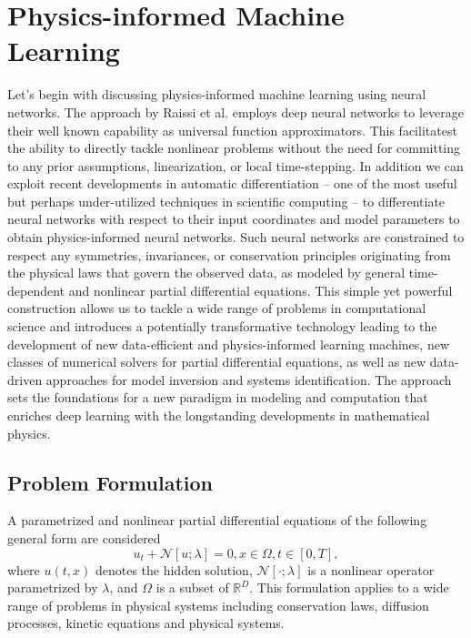\documentclass[book.tex]{subfiles}
\begin{document}
\section{Physics-informed Machine Learning}
Let's begin with discussing physics-informed machine learning using neural networks. The approach by Raissi et al.\cite{raissi2019physics} employs deep neural networks to leverage their well known capability as universal function approximators. This facilitatest the ability to directly tackle nonlinear problems without the need for committing to any prior assumptions, linearization, or local time-stepping. In addition we can exploit recent developments in automatic differentiation – one of the most useful but perhaps under-utilized techniques in scientific computing – to differentiate neural networks with respect to their input coordinates and model parameters to obtain physics-informed neural networks. Such neural networks are constrained to respect any symmetries, invariances, or conservation principles originating from the physical laws that govern the observed data, as modeled by general time-dependent and nonlinear partial differential equations. This simple yet powerful construction allows us to tackle a wide range of problems in computational science and introduces a potentially transformative technology leading to the development of new data-efficient and physics-informed learning machines, new classes of numerical solvers for partial differential equations, as well as new data-driven approaches for model inversion and systems identification. The approach sets the foundations for a new paradigm in modeling and computation that enriches deep learning with the longstanding developments in mathematical physics.

\subsection{Problem Formulation}
A parametrized and nonlinear partial differential equations of the following general form are considered 
\begin{equation}
    u_t + \mathcal{N}[u;\lambda]=0, x \in \Omega, t\in [0,T],
\end{equation}
where $u(t, x)$ denotes the hidden solution, $\mathcal{N[\cdot;\lambda]}$ is a nonlinear operator parametrized by $\lambda$, and $\Omega$ is a subset of $\mathbb{R}^D$. This formulation applies to a wide range of problems in physical systems including conservation laws, diffusion processes, kinetic equations and physical systems.
\end{document}

